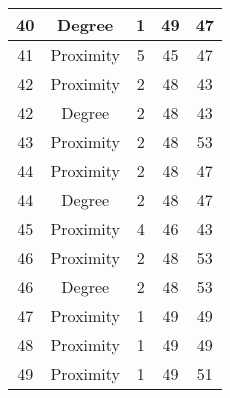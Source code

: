 \documentclass[results.tex]{subfiles}
\begin{document}
\begin{center}
\begin{tabular}{| c || c | c | c | c |}
            \hline
            40                      & Degree                       & 1                      & 49                      & 47                   \\
            \hline
            41                      & Proximity                    & 5                      & 45                      & 47                   \\
            \hline
            42                      & Proximity                    & 2                      & 48                      & 43                   \\
            \hline
            42                      & Degree                       & 2                      & 48                      & 43                   \\
            \hline
            43                      & Proximity                    & 2                      & 48                      & 53                   \\
            \hline
            44                      & Proximity                    & 2                      & 48                      & 47                   \\
            \hline
            44                      & Degree                       & 2                      & 48                      & 47                   \\
            \hline
            45                      & Proximity                    & 4                      & 46                      & 43                   \\
            \hline
            46                      & Proximity                    & 2                      & 48                      & 53                   \\
            \hline
            46                      & Degree                       & 2                      & 48                      & 53                   \\
            \hline
            47                      & Proximity                    & 1                      & 49                      & 49                   \\
            \hline
            48                      & Proximity                    & 1                      & 49                      & 49                   \\
            \hline
            49                      & Proximity                    & 1                      & 49                      & 51                   \\
            \hline
        \end{tabular}
    \end{center}
\end{document}
